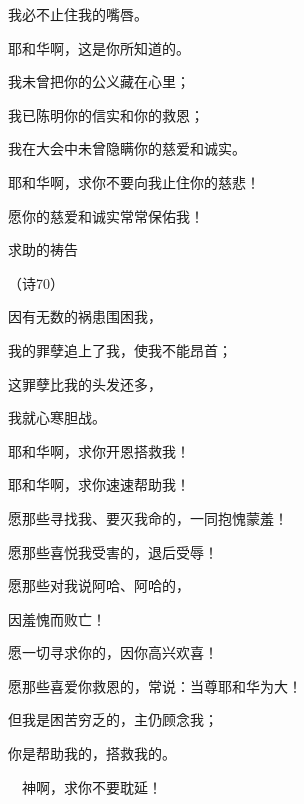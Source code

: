 {\par }{\Q 我必不止住我的嘴唇。
\par }{\Q 耶和华啊，这是你所知道的。
\par }{\Q {}我未曾把你的公义藏在心里；
\par }{\Q 我已陈明你的信实和你的救恩；
\par }{\Q 我在大会中未曾隐瞒你的慈爱和诚实。
\par }{\BB \par }{\Q {}耶和华啊，求你不要向我止住你的慈悲！
\par }{\Q 愿你的慈爱和诚实常常保佑我！
\par }{\SH 求助的祷告
\par }{\R （诗70）
\par }{\Q {}因有无数的祸患围困我，
\par }{\Q 我的罪孽追上了我，使我不能昂首；
\par }{\Q 这罪孽比我的头发还多，
\par }{\Q 我就心寒胆战。
\par }{\Q {}耶和华啊，求你开恩搭救我！
\par }{\Q 耶和华啊，求你速速帮助我！
\par }{\Q {}愿那些寻找我、要灭我命的，一同抱愧蒙羞！
\par }{\Q 愿那些喜悦我受害的，退后受辱！
\par }{\Q {}愿那些对我说阿哈、阿哈的，
\par }{\Q 因羞愧而败亡！
\par }{\BB \par }{\Q {}愿一切寻求你的，因你高兴欢喜！
\par }{\Q 愿那些喜爱你救恩的，常说：当尊耶和华为大！
\par }{\Q {}但我是困苦穷乏的，主仍顾念我；
\par }{\Q 你是帮助我的，搭救我的。
\par }{\Q 　神啊，求你不要耽延！

}
